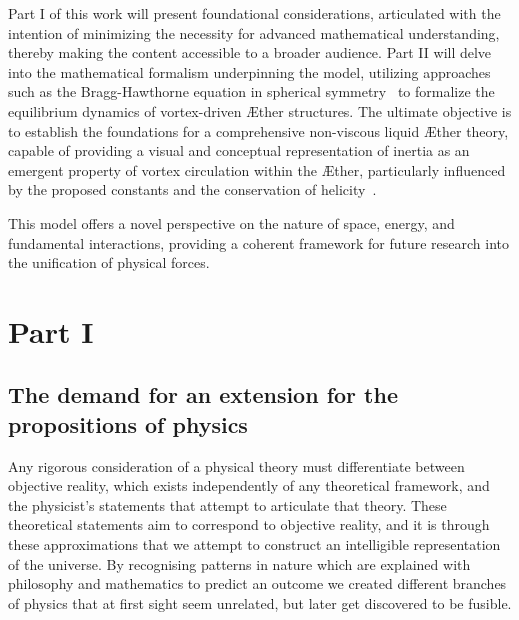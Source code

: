 \documentclass[a4paper,10pt]{article}
\begin{document}
    Part I of this work will present foundational considerations, articulated with the intention of minimizing the necessity for advanced mathematical understanding, thereby making the content accessible to a broader audience. Part II will delve into the mathematical formalism underpinning the model, utilizing approaches such as the Bragg-Hawthorne equation in spherical symmetry~\cite{keller2024} to formalize the equilibrium dynamics of vortex-driven \AE ther structures. The ultimate objective is to establish the foundations for a comprehensive non-viscous liquid \AE ther theory, capable of providing a visual and conceptual representation of inertia as an emergent property of vortex circulation within the \AE ther, particularly influenced by the proposed constants and the conservation of helicity~\cite{kleckner2016}.





    This model offers a novel perspective on the nature of space, energy, and fundamental interactions, providing a coherent framework for future research into the unification of physical forces.





    \section{Part I}\label{sec:part-i}
    \subsection{The demand for an extension for the propositions of physics}\label{sec:introduction}

    Any rigorous consideration of a physical theory must differentiate between objective reality, which exists independently of any theoretical framework, and the physicist's statements that attempt to articulate that theory. These theoretical statements aim to correspond to objective reality, and it is through these approximations that we attempt to construct an intelligible representation of the universe. By recognising patterns in nature which are explained with philosophy and mathematics to predict an outcome we created different branches of physics that at first sight seem unrelated, but later get discovered to be fusible.
\end{document}

